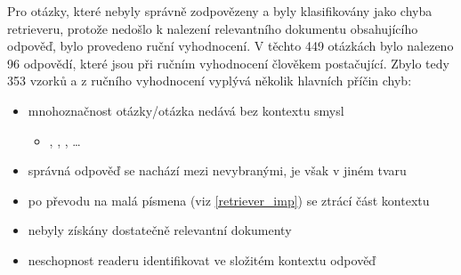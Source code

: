 Pro otázky, které nebyly správně zodpovězeny a byly klasifikovány jako chyba retrieveru, protože nedošlo k nalezení relevantního dokumentu obsahujícího odpověď, bylo provedeno ruční vyhodnocení. V těchto 449 otázkách bylo nalezeno 96 odpovědí, které jsou při ručním vyhodnocení člověkem postačující. Zbylo tedy 353 vzorků a z ručního vyhodnocení vyplývá několik hlavních příčin chyb:
\begin{itemize}
    \item mnohoznačnost otázky/otázka nedává bez kontextu smysl
    \begin{itemize}
        \item {}, , , \dots
    \end{itemize}
    \item správná odpověď se nachází mezi nevybranými, je však v jiném tvaru
    \item po převodu na malá písmena (viz \ref{retriever_imp}) se ztrácí část kontextu
    \item nebyly získány dostatečně relevantní dokumenty
    \item neschopnost readeru identifikovat ve složitém kontextu odpověď
\end{itemize}

